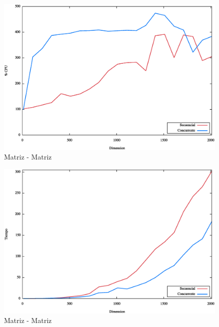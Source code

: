 \begin{figure}[!htb]
    \centering
    \includegraphics[scale=.5]{matrizdimensiocpu.eps}
    \caption{Matriz - Matriz}
    \label{fig:digraph}
\end{figure}
\begin{figure}[!htb]
    \centering
    \includegraphics[scale=.5]{matrizdimensiotiempo.eps}
    \caption{Matriz - Matriz}
    \label{fig:digraph}
\end{figure}
